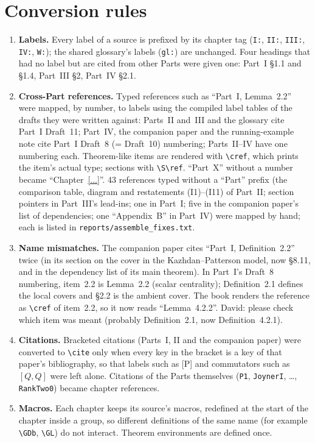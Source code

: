 \documentclass[11pt]{article}
\begin{document}
\section*{Conversion rules}
\begin{enumerate}[leftmargin=*]
\item \textbf{Labels.}  Every label of a source is prefixed by its
chapter tag (\texttt{I:}, \texttt{II:}, \texttt{III:}, \texttt{IV:},
\texttt{W:}); the shared glossary's labels (\texttt{gl:}) are unchanged.
Four headings that had no label but are cited from other Parts were
given one: Part~I \S1.1 and \S1.4, Part~III \S2, Part~IV \S2.1.
\item \textbf{Cross-Part references.}  Typed references such as
``Part~I, Lemma~2.2'' were mapped, by number, to labels using the
compiled label tables of the drafts they were written against: Parts~II
and~III and the glossary cite Part~I Draft~11; Part~IV, the companion
paper and the running-example note cite Part~I Draft~8 (= Draft~10)
numbering; Parts~II--IV have one numbering each.  Theorem-like items are
rendered with \verb|\cref|, which prints the item's actual type;
sections with \verb|\S\ref|.  ``Part~X'' without a number became
``Chapter~\ref{...}''.  43 references typed without a ``Part'' prefix
(the comparison table, diagram and restatements (I1)--(I11) of Part~II;
section pointers in Part~III's lead-ins; one in Part~I; five in the
companion paper's list of dependencies; one ``Appendix~B'' in Part~IV)
were mapped by hand; each is listed in \texttt{reports/assemble\_fixes.txt}.
\item \textbf{Name mismatches.}  The companion paper cites ``Part~I,
Definition~2.2'' twice (in its section on the cover in the Kazhdan--Patterson model,
now \S8.11, and in the dependency list of its main theorem).  In Part~I's Draft~8 numbering, item~2.2 is Lemma~2.2 (scalar
centrality); Definition~2.1 defines the local covers and \S2.2 is the
ambient cover.  The book renders the reference as \verb|\cref| of item~2.2,
so it now reads ``Lemma~4.2.2''.  David: please check which item was
meant (probably Definition~2.1, now Definition~4.2.1).
\item \textbf{Citations.}  Bracketed citations (Parts~I, II and the
companion paper) were converted to \verb|\cite| only when every key in
the bracket is a key of that paper's bibliography, so that labels such as
[P] and commutators such as $[Q,Q]$ were left alone.  Citations of the
Parts themselves (\texttt{P1}, \texttt{JoynerI}, \ldots,
\texttt{RankTwo0}) became chapter references.
\item \textbf{Macros.}  Each chapter keeps its source's macros,
redefined at the start of the chapter inside a group, so different
definitions of the same name (for example \verb|\GDb|, \verb|\GL|) do not
interact.  Theorem environments are defined once.
\end{enumerate}
\end{document}
